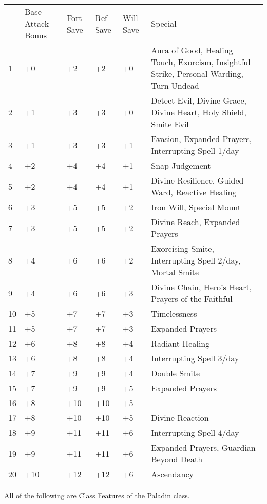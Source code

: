 \begin{table}[htb]
\begin{small}
\begin{tabular}[h]{lp{1.9cm}p{0.7cm}p{0.7cm}p{0.7cm}p{9cm}}
&   Base Attack Bonus&  Fort Save&  Ref Save&   Will Save&  Special\\
1&  +0& +2& +2& +0&  Aura of Good, Healing Touch, Exorcism, Insightful Strike, Personal Warding, Turn Undead\\
2&  +1& +3& +3& +0&  Detect Evil, Divine Grace, Divine Heart, Holy Shield, Smite Evil\\
3&  +1& +3& +3& +1&  Evasion, Expanded Prayers, Interrupting Spell 1/day\\
4&  +2& +4& +4& +1&  Snap Judgement\\
5&  +2& +4& +4& +1&  Divine Resilience, Guided Ward, Reactive Healing\\
6&  +3& +5& +5& +2&  Iron Will, Special Mount\\
7&  +3& +5& +5& +2&  Divine Reach, Expanded Prayers\\
8&  +4& +6& +6& +2&  Exorcising Smite, Interrupting Spell 2/day, Mortal Smite\\
9&  +4& +6& +6& +3&  Divine Chain, Hero's Heart, Prayers of the Faithful\\
10& +5& +7& +7& +3&  Timelessness  \\
11& +5& +7& +7& +3&  Expanded Prayers\\
12& +6& +8& +8& +4&  Radiant Healing\\
13& +6& +8& +8& +4&  Interrupting Spell 3/day\\
14& +7& +9& +9& +4&  Double Smite\\
15& +7& +9& +9& +5&  Expanded Prayers\\
16& +8& +10& +10& +5&  \\
17& +8& +10& +10& +5&  Divine Reaction\\
18& +9& +11& +11& +6&  Interrupting Spell 4/day\\
19& +9& +11& +11& +6&  Expanded Prayers, Guardian Beyond Death\\
20& +10& +12& +12& +6&  Ascendancy\\
\end{tabular}
\end{small}
\end{table}

\smallskip\noindent All of the following are Class Features of the Paladin class.


